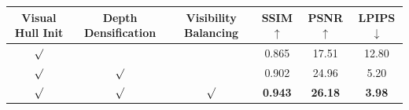 \documentclass[letterpaper]{article} %
\begin{document}
   

\begin{table}[t!]
\centering

\label{tab:ablation}

\setlength{\tabcolsep}{2.5mm}
\renewcommand{\arraystretch}{1.05}

\small
\begin{tabular}{@{}cccccc@{}}
\toprule
\scriptsize Visual Hull Init & \scriptsize Depth Densification & \scriptsize Visibility Balancing & SSIM$\uparrow$ & PSNR$\uparrow$ & LPIPS$\downarrow$ \\
\midrule
$\surd$  &              &              & 0.865  & 17.51  & 12.80  \\
$\surd$  & $\surd$      &              & 0.902  & 24.96  & 5.20  \\
$\surd$  & $\surd$      & $\surd$      & \textbf{0.943} & \textbf{26.18} & \textbf{3.98} \\
\bottomrule

\end{tabular}

\end{table}
\end{document}
